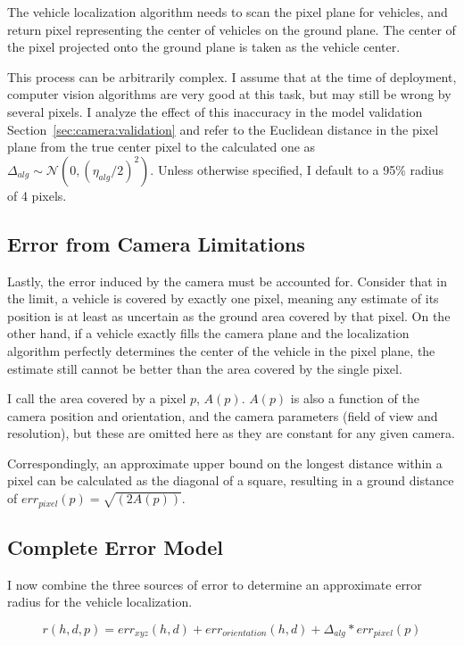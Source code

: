 \documentclass[a4paper,12pt,twoside,openright]{report}
\begin{document}
The vehicle localization algorithm needs to scan the pixel plane for vehicles,
and return pixel representing the center of vehicles on the ground plane.
The center of the pixel projected onto the ground plane is taken as the vehicle center.

This process can be arbitrarily complex. I assume that at the time of deployment, 
computer vision algorithms are very good at this task, but may still
be wrong by several pixels. I analyze the effect of this inaccuracy
in the model validation Section~\ref{sec:camera:validation} and refer to the Euclidean distance
in the pixel plane from the true center pixel to the calculated one
as $\Delta_{alg} \sim \mathcal{N}(0, (\eta_{alg}/2)^2)$. Unless otherwise specified,
I default to a 95\% radius of 4 pixels.

\subsection{Error from Camera Limitations}

Lastly, the error induced by the camera must be accounted for. Consider that 
in the limit, a vehicle is covered by exactly one pixel, meaning any estimate
of its position is at least as uncertain as the ground area 
covered by that pixel. On the other hand, if a vehicle
exactly fills the camera plane and the localization algorithm perfectly determines
the center of the vehicle in the pixel plane, the estimate still cannot
be better than the area covered by the single pixel.

I call the area covered by a pixel $p$, $A(p)$. $A(p)$ is also a function of the camera
position and orientation, and the camera parameters (field of view and resolution),
but these are omitted here as they are constant for any given camera.

Correspondingly, an approximate upper bound on the longest distance
within a pixel can be calculated as the diagonal of a square,
resulting in a ground distance of $err_{pixel}(p) = \sqrt{(2A(p))}$. 


\subsection{Complete Error Model}
\label{sec:cameramodel:r}

I now combine the three sources of error to determine an approximate
error radius for the vehicle localization.

\[
    r(h,d,p) = err_{xyz}(h,d) + err_{orientation}(h,d) + \Delta_{alg}*err_{pixel}(p)
\]
\end{document}
